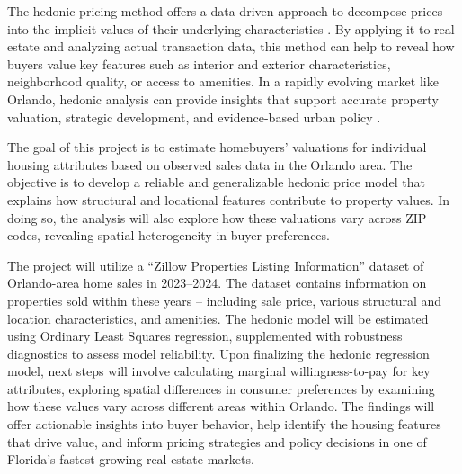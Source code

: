 \documentclass[11pt]{article}
\begin{document}
The hedonic pricing method offers a data-driven approach to decompose prices into the implicit values of their underlying characteristics \cite{rosen1974}. By applying it to real estate and analyzing actual transaction data, this method can help to reveal how buyers value key features such as interior and exterior characteristics, neighborhood quality, or access to amenities. In a rapidly evolving market like Orlando, hedonic analysis can provide insights that support accurate property valuation, strategic development, and evidence-based urban policy \cite{palmquist2005}.

The goal of this project is to estimate homebuyers’ valuations for individual housing attributes based on observed sales data in the Orlando area. The objective is to develop a reliable and generalizable hedonic price model that explains how structural and locational features contribute to property values. In doing so, the analysis will also explore how these valuations vary across ZIP codes, revealing spatial heterogeneity in buyer preferences.

The project will utilize a “Zillow Properties Listing Information” dataset of Orlando-area home sales in 2023–2024. The dataset contains information on properties sold within these years – including sale price, various structural and location characteristics, and amenities. The hedonic model will be estimated using Ordinary Least Squares regression, supplemented with robustness diagnostics to assess model reliability. Upon finalizing the hedonic regression model, next steps will involve calculating marginal willingness-to-pay for key attributes, exploring spatial differences in consumer preferences by examining how these values vary across different areas within Orlando. The findings will offer actionable insights into buyer behavior, help identify the housing features that drive value, and inform pricing strategies and policy decisions in one of Florida’s fastest-growing real estate markets.

	
	
\clearpage


	
\end{document}
